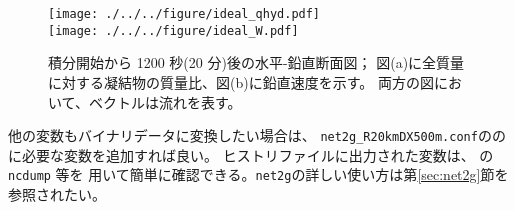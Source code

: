 \begin{figure}[t]
\begin{center}
  \texttt{[image: ./../../figure/ideal\_qhyd.pdf]}\\
  \texttt{[image: ./../../figure/ideal\_W.pdf]}\\
  \caption{積分開始から 1200 秒(20 分)後の水平-鉛直断面図；
           図(a)に全質量に対する凝結物の質量比、図(b)に鉛直速度を示す。
           両方の図において、ベクトルは流れを表す。}
  \label{fig_ideal}
\end{center}
\end{figure}

他の変数もバイナリデータに変換したい場合は、
\verb|net2g_R20kmDX500m.conf|のの に必要な変数を追加すれば良い。
ヒストリファイルに出力された変数は、{\netcdf} の\verb|ncdump| 等を
用いて簡単に確認できる。\verb|net2g|の詳しい使い方は第\ref{sec:net2g}節を参照されたい。
